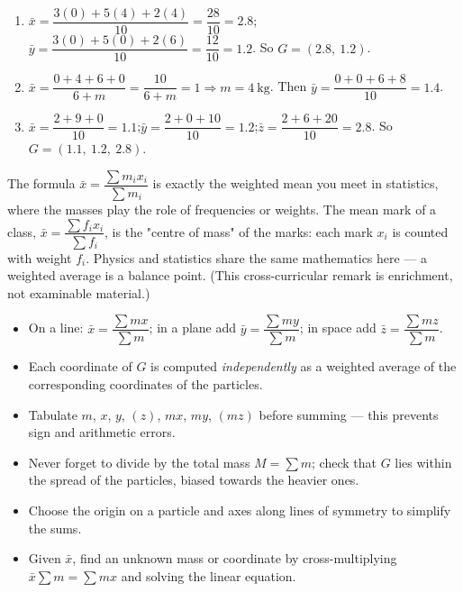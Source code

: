 \documentclass[11pt]{article}
\newcommand{\cle}[1]{{\popxbold\color{popdark}#1}}
\begin{document}
\begin{corrige}[Exercise 1]
\begin{enumerate}
\item $\bar{x} = \dfrac{3(0)+5(4)+2(4)}{10} = \dfrac{28}{10} = 2.8$;\quad $\bar{y} = \dfrac{3(0)+5(0)+2(6)}{10} = \dfrac{12}{10} = 1.2$. So $G = (2.8,\ 1.2)$.
\item $\bar{x} = \dfrac{0 + 4 + 6 + 0}{6 + m} = \dfrac{10}{6+m} = 1 \Rightarrow m = 4\ \mathrm{kg}$. Then $\bar{y} = \dfrac{0+0+6+8}{10} = 1.4$.
\item $\bar{x} = \dfrac{2+9+0}{10} = 1.1$;\quad $\bar{y} = \dfrac{2+0+10}{10} = 1.2$;\quad $\bar{z} = \dfrac{2+6+20}{10} = 2.8$. So $G = (1.1,\ 1.2,\ 2.8)$.
\end{enumerate}
\end{corrige}

\begin{savaistu}
The formula $\bar{x} = \dfrac{\sum m_i x_i}{\sum m_i}$ is exactly the \cle{weighted mean} you meet in statistics, where the masses play the role of frequencies or weights. The mean mark of a class, $\bar{x} = \dfrac{\sum f_i x_i}{\sum f_i}$, is the "centre of mass" of the marks: each mark $x_i$ is counted with weight $f_i$. Physics and statistics share the same mathematics here — a weighted average is a balance point. (This cross-curricular remark is enrichment, not examinable material.)
\end{savaistu}

\begin{aretenir}
\begin{itemize}
\item On a line: $\bar{x} = \dfrac{\sum mx}{\sum m}$; in a plane add $\bar{y} = \dfrac{\sum my}{\sum m}$; in space add $\bar{z} = \dfrac{\sum mz}{\sum m}$.
\item Each coordinate of $G$ is computed \emph{independently} as a weighted average of the corresponding coordinates of the particles.
\item Tabulate $m$, $x$, $y$, $(z)$, $mx$, $my$, $(mz)$ before summing — this prevents sign and arithmetic errors.
\item Never forget to divide by the total mass $M = \sum m$; check that $G$ lies within the spread of the particles, biased towards the heavier ones.
\item Choose the origin on a particle and axes along lines of symmetry to simplify the sums.
\item Given $\bar{x}$, find an unknown mass or coordinate by cross-multiplying $\bar{x}\sum m = \sum mx$ and solving the linear equation.
\end{itemize}
\end{aretenir}
\end{document}
